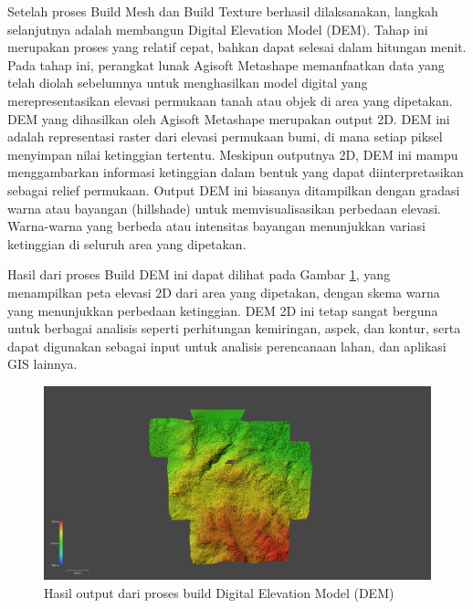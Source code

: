 \par Setelah proses Build Mesh dan Build Texture berhasil dilaksanakan, langkah selanjutnya adalah membangun Digital Elevation Model (DEM). Tahap ini merupakan proses yang relatif cepat, bahkan dapat selesai dalam hitungan menit. Pada tahap ini, perangkat lunak Agisoft Metashape memanfaatkan data yang telah diolah sebelumnya untuk menghasilkan model digital yang merepresentasikan elevasi permukaan tanah atau objek di area yang dipetakan. DEM yang dihasilkan oleh Agisoft Metashape merupakan output 2D. DEM ini adalah representasi raster dari elevasi permukaan bumi, di mana setiap piksel menyimpan nilai ketinggian tertentu. Meskipun outputnya 2D, DEM ini mampu menggambarkan informasi ketinggian dalam bentuk yang dapat diinterpretasikan sebagai relief permukaan. Output DEM ini biasanya ditampilkan dengan gradasi warna atau bayangan (hillshade) untuk memvisualisasikan perbedaan elevasi. Warna-warna yang berbeda atau intensitas bayangan menunjukkan variasi ketinggian di seluruh area yang dipetakan.

Hasil dari proses Build DEM ini dapat dilihat pada Gambar \ref{dem}, yang menampilkan peta elevasi 2D dari area yang dipetakan, dengan skema warna yang menunjukkan perbedaan ketinggian.
DEM 2D ini tetap sangat berguna untuk berbagai analisis seperti perhitungan kemiringan, aspek, dan kontur, serta dapat digunakan sebagai input untuk analisis perencanaan lahan, dan aplikasi GIS lainnya.

\begin{figure} [H]
    \centering
    \includegraphics[width=1\linewidth]{image/DEM.png}
    \caption{Hasil output dari proses build Digital Elevation Model (DEM)}
    \label{dem}
\end{figure}

